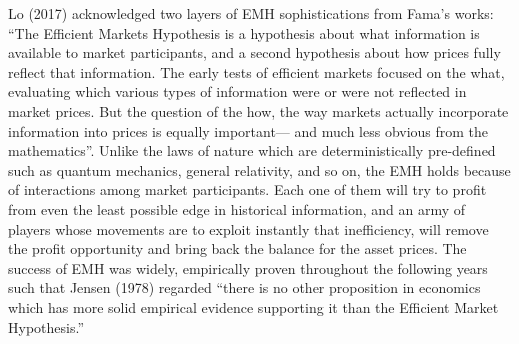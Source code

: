 Lo (2017) acknowledged two layers of EMH sophistications from Fama’s works: “The Efficient Markets Hypothesis is a hypothesis about what information is available to market participants, and a second hypothesis about how prices fully reflect that information. The early tests of efficient markets focused on the what, evaluating which various types of information were or were not reflected in market prices. But the question of the how, the way markets actually incorporate information into prices is equally important— and much less obvious from the mathematics”. Unlike the laws of nature which are deterministically pre-defined such as quantum mechanics, general relativity, and so on, the EMH holds because of interactions among market participants. Each one of them will try to profit from even the least possible edge in historical information, and an army of players whose movements are to exploit instantly that inefficiency, will remove the profit opportunity and bring back the balance for the asset prices.
The success of EMH was widely, empirically proven throughout the following years such that Jensen (1978) regarded “there is no other proposition in economics which has more solid empirical evidence supporting it than the Efficient Market Hypothesis.”

